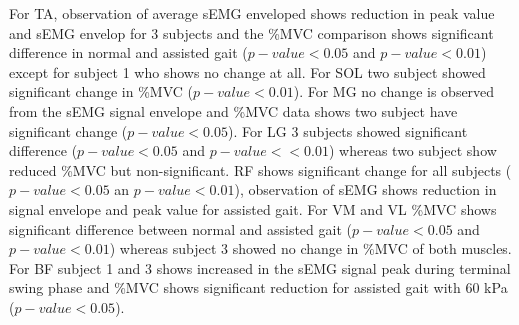 \documentclass[letterpaper, 10 pt, conference]{ieeeconf}  %
\begin{document}
For TA, observation of average sEMG enveloped shows reduction in peak value and sEMG envelop for 3 subjects and the \%MVC comparison shows significant difference in normal and assisted gait ($p-value < 0.05$ and $p-value < 0.01$) except for subject 1 who shows no change at all. For SOL two subject showed significant change in \%MVC ($p-value < 0.01$). For MG no change is observed from the sEMG signal envelope and \%MVC data shows two subject have significant change ($p-value < 0.05$). For LG 3 subjects showed significant difference ($p-value < 0.05$ and $p-value < <0.01$) whereas two subject show reduced \%MVC but non-significant. RF shows significant change for all subjects ($p-value < 0.05$ an $p-value < 0.01$), observation of sEMG shows reduction in signal envelope and peak value for assisted gait. For VM and VL \%MVC shows significant difference between normal and assisted gait ($p-value < 0.05$ and $p-value < 0.01$) whereas subject 3 showed no change in \%MVC of both muscles. For BF subject 1 and 3 shows increased in the sEMG signal peak during terminal swing phase and \%MVC shows significant reduction for assisted gait with 60 kPa ($p-value < 0.05$).
\end{document}
